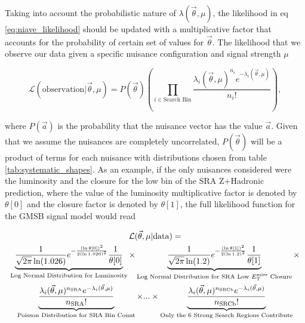       Taking into account the probabilistic nature of $\lambda(\vec{\theta}, \mu)$, the likelihood in eq \ref{eq:niave_likelihood} should be updated with a multiplicative factor that accounts for the probability of certain set of values for $\vec{\theta}$. The likelihood that we observe our data given a specific nuisance configuration and signal strength $\mu$

      \begin{equation} 
        \mathcal{L}(\text{observation} | \vec{\theta}, \mu ) = P(\vec{\theta}) \left( \prod_{i \in \text{Search Bin}} \frac{\lambda_i(\vec{\theta}, \mu)^{n_i} e^{-\lambda_i(\vec{\theta}, \mu)}}{n_i !} \right), \label{eq:true_likelihood}
      \end{equation}
      

      where $P(\vec{a})$ is the probability that the nuisance vector has the value $\vec{a}$. Given that we assume the nuisances are completely uncorrelated, $P(\vec{\theta})$ will be a product of terms for each nuisance with distributions chosen from table \ref{tab:systematic_shapes}. As an example, if the only nuisances considered were the luminosity and the closure for the low \MET bin of the SRA Z+Hadronic prediction, where the value of the luminosity multiplicative factor is denoted by $\theta[0]$ and the closure factor is denoted by $\theta[1]$, the full likelihood function for the GMSB signal model would read

      \begin{multline}
          \mathcal{L}(\vec{\theta}, \mu | \text{data} ) = \\
          \underbrace{\frac{1}{\sqrt{2\pi} \ln(1.026)} e^{-\frac{\left(\ln\theta[0]\right)^2}{2 \left(\ln 1.026\right)^2}} \frac{1}{\theta[0]}}_{\text{Log Normal Distribution for Luminosity}} \times \underbrace{\frac{1}{\sqrt{2\pi} \ln(1.2)} e^{-\frac{\left(\ln\theta[1]\right)^2}{2 \left(\ln 1.2\right)^2}} \frac{1}{\theta[1]}}_{\text{Log Normal Distribution for SRA Low \MET Closure}} \times \\
          \underbrace{\frac{\lambda_i(\vec{\theta}, \mu)^{n_{\text{SRA}}} e^{-\lambda_i(\vec{\theta}, \mu)}}{n_{\text{SRA}} !}}_{\text{Poisson Distribution for SRA Bin Count}} \times ... \times \underbrace{\frac{\lambda_i(\vec{\theta}, \mu)^{n_{\text{SRCb}}} e^{-\lambda_i(\vec{\theta}, \mu)}}{n_{\text{SRCb}} !}}_{\text{Only the 6 Strong Search Regions Contribute}}
      \end{multline}




